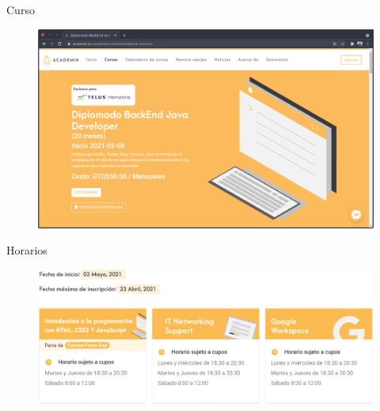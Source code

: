 \documentclass[aspectratio=169]{beamer}
\begin{document}
\begin{frame}{Curso}
	\begin{figure}
		\centering
		\includegraphics[width=\linewidth]{Images/curso}
	\end{figure}
\end{frame}

\begin{frame}{Horarios}
	\begin{figure}
		\centering
		\includegraphics[width=\linewidth]{Images/horarios}
	\end{figure}
\end{frame}


{
    \begin{frame}
    \end{frame}
}
\end{document}
